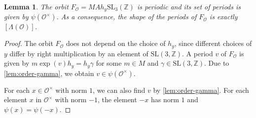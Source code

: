 \documentclass[11pt,letterpaper]{amsart}
\newtheorem{lem}[theorem]{Lemma}
\theoremstyle{definition}
\theoremstyle{remark}
\renewcommand{\rm}[1]{\mathrm{#1}}
\newcommand{\cal}[1]{\mathcal{#1}}
\newcommand{\bb}[1]{\mathbb{#1}}
\newcommand{\Z}{\bb Z}
\newcommand{\calO}{\cal O}
\newcommand{\SL}{\rm{SL}}
\begin{document}
	\begin{lem}
		The orbit $ F_\calO=MAh_y\SL_3(\Z)$ is periodic and its set of periods is given by $\psi(\calO^\times)$. 
		As a consequence, the shape of the periods of $F_\calO$ is exactly $[\Lambda(\calO)]$.
	\end{lem}
	\begin{proof}
		The orbit $F_\calO$ does not depend on the choice of $h_y$, since different choices of $y$ differ by right multiplication by an element of $\SL(3,\Z)$.
		A period $v$ of $F_\calO$ is given by $m\exp(v)h_y=h_y\gamma$ for some $m\in M$ and $\gamma\in\SL(3,\Z)$. Due to \cref{lem:order-gamma}, we obtain $v\in \psi(\calO^\times)$. 
		
		For each $x\in\calO^\times$ with norm $1$, we can also find $v$ by \cref{lem:order-gamma}. For each element $x$ in $\calO^\times$ with norm $-1$, the element $-x$ has norm $1$ and $\psi(x)=\psi(-x)$.
	\end{proof}
\end{document}
